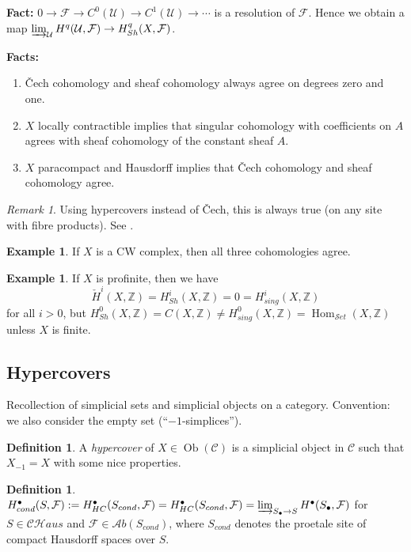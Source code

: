 \documentclass[11pt,A4]{article}
\theoremstyle{plain}
\theoremstyle{definition}
\newtheorem{defn}[thm]{Definition}
\newtheorem{exa}[thm]{Example}
\theoremstyle{remark}
\newtheorem{rem}[thm]{Remark}
\newcommand{\Z}{\mathbb{Z}}
\newcommand{\1}{\mathbbm{1}}
\newcommand{\scrC}{\mathscr{C}}
\newcommand{\CHaus}{\mathscr{CH}aus}
\newcommand{\Ab}{\mathscr{A}b}
\newcommand{\Set}{\mathscr{S}et}
\newcommand{\F}{\mathcal{F}}
\newcommand{\U}{\mathcal{U}}
\DeclareMathOperator{\Hom}{Hom}
\DeclareMathOperator{\Ob}{Ob}
\newcommand{\grd}{^{\bullet}}
\begin{document}
\textbf{Fact:} $0\to \F\to C^{0}(\U) \to C^{1}(\U)\to \cdots $ is a resolution of $\F$.
Hence  we obtain a map $\varinjlim_{\U}H^{q}(\U,\F)\to H^{q}_{Sh}(X,\F)$.

\textbf{Facts:}
\begin{enumerate}[label=\arabic*)]
    \item \v{C}ech cohomology and sheaf cohomology always agree on degrees zero and one.
    \item $X$ locally contractible implies that singular cohomology with coefficients on $A$ agrees with sheaf cohomology of the constant sheaf $A$.
    \item $X$ paracompact and Hausdorff implies that \v{C}ech cohomology and sheaf cohomology agree.
\end{enumerate}

\begin{rem}
    Using hypercovers instead of \v{C}ech, this is always true (on any site with fibre products).
    See \cite[\href{https://stacks.math.columbia.edu/tag/01H0}{Tag 01H0}]{sta19}.
\end{rem}

\begin{exa}
    If $X$ is a CW complex, then all three cohomologies agree.
\end{exa}

\begin{exa}
    If $X$ is profinite, then we have
    \[ \check{H}^{i}(X,\Z)=H^{i}_{Sh}(X,\Z)=0=H^{i}_{sing}(X,\Z) \]
    for all $i>0$, but $H^{0}_{Sh}(X,\Z)=C(X,\Z)\neq H^{0}_{sing}(X,\Z)=\Hom_{\Set}(X,\Z)$ unless $X$ is finite.
\end{exa}

\subsection{Hypercovers}

Recollection of simplicial sets and simplicial objects on a category.
Convention: we also consider the empty set (``$-1$-simplices'').

\begin{defn}
    A \textit{hypercover} of $X\in \Ob(\scrC)$ is a simplicial object in $\scrC$ such that $X_{-1}=X$ with some nice properties.
\end{defn}

\begin{defn}
    $H_{cond}\grd(S,\F):=H\grd_{HC}(S_{cond},\F)=H\grd_{HC}(S_{cond},\F)=\varinjlim_{S_{\bullet}\to S}H\grd(S_{\bullet},\F)$ for $S\in \CHaus$ and $\F\in \Ab(S_{cond})$, where $S_{cond}$ denotes the proetale site of compact Hausdorff spaces over $S$.
\end{defn}
\end{document}
